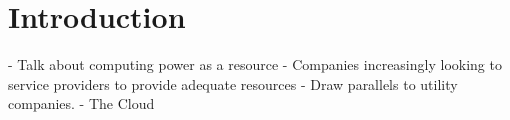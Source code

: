 \chapter{Introduction}

- Talk about computing power as a resource
- Companies increasingly looking to service providers to provide adequate resources
- Draw parallels to utility companies.
- The Cloud

